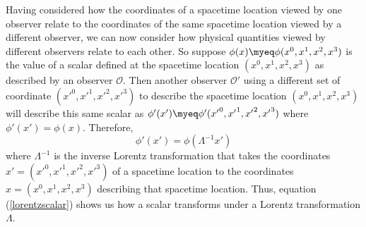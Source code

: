 \documentclass[12pt]{report}
\begin{document}
Having considered how the coordinates of a spacetime location viewed by one observer relate to the coordinates of the same spacetime location viewed by a different observer, we can now consider how physical quantities viewed by different observers relate to each other. So suppose $\phi(x)\myeq\phi(x^0, x^1, x^2, x^3)$ is the value of a scalar defined at the spacetime location $(x^0, x^1, x^2, x^3)$ as described by an observer $\mathcal{O}$. Then another observer $\mathcal{O}'$ using a different set of coordinate $({x'}^0, {x'}^1, {x'}^2, {x'}^3)$ to describe the spacetime location $(x^0, x^1, x^2, x^3)$ will describe this same scalar as $\phi'(x')\myeq\phi'({x'}^0, {x'}^1, {x'}^2, {x'}^3)$  where $\phi'(x')=\phi(x)$. Therefore,
\begin{equation}\label{lorentzscalar}
\phi'(x')=\phi(\Lambda^{-1}x')
\end{equation} 
where $\Lambda^{-1}$ is the inverse Lorentz transformation that takes the coordinates $x'=({x'}^0, {x'}^1, {x'}^2, {x'}^3)$ of a spacetime location to the coordinates $x=(x^0, x^1, x^2, x^3)$ describing that spacetime location. Thus, equation (\ref{lorentzscalar}) shows us how a scalar transforms under a Lorentz transformation $\Lambda$. 
\end{document}
